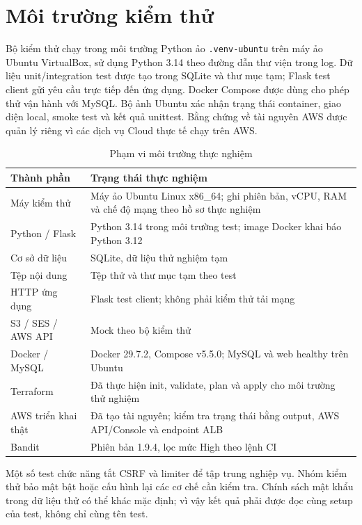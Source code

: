 \section{Môi trường kiểm thử}
Bộ kiểm thử chạy trong môi trường Python ảo \texttt{.venv-ubuntu} trên máy ảo Ubuntu VirtualBox, sử dụng Python 3.14 theo đường dẫn thư viện trong log. Dữ liệu unit/integration test được tạo trong SQLite và thư mục tạm; Flask test client gửi yêu cầu trực tiếp đến ứng dụng. Docker Compose được dùng cho phép thử vận hành với MySQL. Bộ ảnh Ubuntu xác nhận trạng thái container, giao diện local, smoke test và kết quả unittest. Bằng chứng về tài nguyên AWS được quản lý riêng vì các dịch vụ Cloud thực tế chạy trên AWS.
\begin{table}[htbp]\centering\small
\caption{Phạm vi môi trường thực nghiệm}
\begin{tabularx}{\textwidth}{P{3.6cm}X}\toprule
\textbf{Thành phần}&\textbf{Trạng thái thực nghiệm}\\\midrule
Máy kiểm thử & Máy ảo Ubuntu Linux x86\_64; ghi phiên bản, vCPU, RAM và chế độ mạng theo hồ sơ thực nghiệm\\
Python / Flask & Python 3.14 trong môi trường test; image Docker khai báo Python 3.12\\
Cơ sở dữ liệu & SQLite, dữ liệu thử nghiệm tạm\\
Tệp nội dung & Tệp thử và thư mục tạm theo test\\
HTTP ứng dụng & Flask test client; không phải kiểm thử tải mạng\\
S3 / SES / AWS API & Mock theo bộ kiểm thử\\
Docker / MySQL & Docker 29.7.2, Compose v5.5.0; MySQL và web healthy trên Ubuntu\\
Terraform & Đã thực hiện init, validate, plan và apply cho môi trường thử nghiệm\\
AWS triển khai thật & Đã tạo tài nguyên; kiểm tra trạng thái bằng output, AWS API/Console và endpoint ALB\\
Bandit & Phiên bản 1.9.4, lọc mức High theo lệnh CI\\\bottomrule
\end{tabularx}\end{table}
Một số test chức năng tắt CSRF và limiter để tập trung nghiệp vụ. Nhóm kiểm thử bảo mật bật hoặc cấu hình lại các cơ chế cần kiểm tra. Chính sách mật khẩu trong dữ liệu thử có thể khác mặc định; vì vậy kết quả phải được đọc cùng setup của test, không chỉ cùng tên test.

